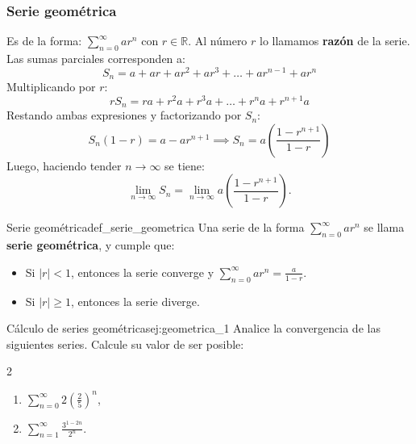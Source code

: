 \subsubsection*{Serie geométrica}
Es de la forma: $\displaystyle\sum_{n=0}^{\infty}ar^n$ con $r \in \mathbb{R}$. Al número $r$ lo llamamos \textbf{razón} de la serie. Las sumas parciales corresponden a:
\[ S_n = a + ar + ar^2 + ar^3 + \dots + ar^{n-1} + ar^n \]
Multiplicando por $r$:
\[ rS_n = ra + r^2a + r^3a + \dots + r^n a + r^{n+1}a \]
Restando ambas expresiones y factorizando por $S_n$:
\[ S_n(1-r) = a - ar^{n+1} \implies S_n = a\left(\frac{1-r^{n+1}}{1-r}\right) \]
Luego, haciendo tender $n\to \infty$ se tiene:
\[ \displaystyle\lim_{n\to\infty}S_n = \lim_{n\to\infty}a\left(\frac{1-r^{n+1}}{1-r}\right). \]

\begin{definition}{Serie geométrica}{def_serie_geometrica}
    Una serie de la forma $\displaystyle\sum_{n=0}^{\infty}ar^n$ se llama \textbf{serie geométrica}, y cumple que:
    \begin{itemize}
        \item Si $|r| < 1$, entonces la serie converge y $\displaystyle\sum_{n=0}^{\infty}ar^n = \frac{a}{1-r}$.
        \item Si $|r| \ge 1$, entonces la serie diverge.
    \end{itemize}
\end{definition}

\begin{example}{Cálculo de series geométricas}{ej:geometrica_1}
    Analice la convergencia de las siguientes series. Calcule su valor de ser posible:
    \begin{multicols}{2}
    \begin{enumerate}
        \item $\displaystyle\sum_{n=0}^{\infty}2\left(\frac{2}{5}\right)^n$,
        \item $\displaystyle\sum_{n=1}^{\infty}\frac{3^{1-2n}}{2^n}$.
    \end{enumerate}
    \end{multicols}
\end{example}

